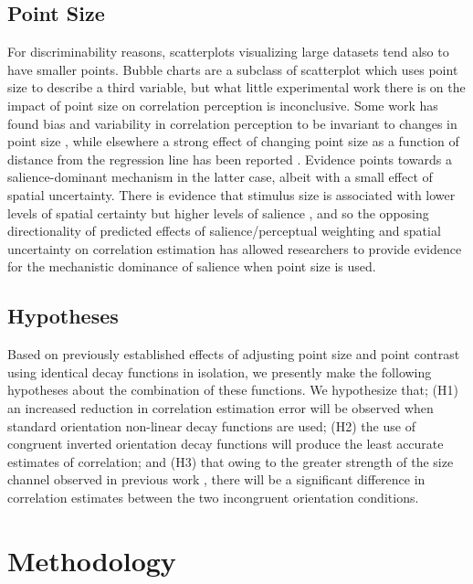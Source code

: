 \documentclass[manuscript, review, anonymous, screen]{acmart}
\begin{document}
\hypertarget{sec-point-size}{%
\subsection{Point Size}\label{sec-point-size}}

For discriminability reasons, scatterplots visualizing large datasets
tend also to have smaller points. Bubble charts are a subclass of
scatterplot which uses point size to describe a third variable, but what
little experimental work there is on the impact of point size on
correlation perception is inconclusive. Some work has found bias and
variability in correlation perception to be invariant to changes in
point size \citep{rensink_2012, rensink_2014}, while elsewhere a strong
effect of changing point size as a function of distance from the
regression line has been reported \citep{strain_2023b}. Evidence points
towards a salience-dominant mechanism in the latter case, albeit with a
small effect of spatial uncertainty. There is evidence that stimulus
size is associated with lower levels of spatial certainty
\citep{alais_2004} but higher levels of salience \citep{healey_2011},
and so the opposing directionality of predicted effects of
salience/perceptual weighting and spatial uncertainty on correlation
estimation has allowed researchers to provide evidence for the
mechanistic dominance of salience when point size is used.

\hypertarget{hypotheses}{%
\subsection{Hypotheses}\label{hypotheses}}

Based on previously established effects of adjusting point size and
point contrast using identical decay functions in isolation, we
presently make the following hypotheses about the combination of these
functions. We hypothesize that; (H1) an increased reduction in
correlation estimation error will be observed when standard orientation
non-linear decay functions are used; (H2) the use of congruent inverted
orientation decay functions will produce the least accurate estimates of
correlation; and (H3) that owing to the greater strength of the size
channel observed in previous work \citep{strain_2023b}, there will be a
significant difference in correlation estimates between the two
incongruent orientation conditions.

\hypertarget{sec-methods}{%
\section{Methodology}\label{sec-methods}}
\end{document}
